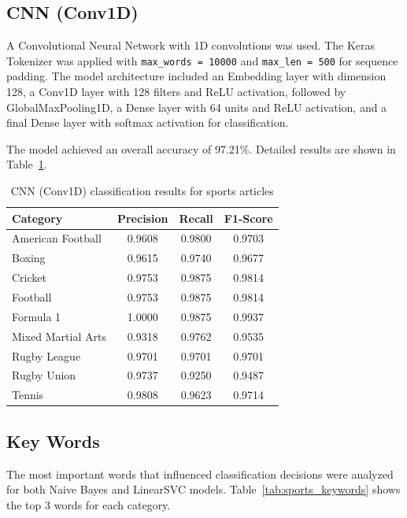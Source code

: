 \documentclass[12pt,a4paper]{article}
\begin{document}
\subsection{CNN (Conv1D)}

A Convolutional Neural Network with 1D convolutions was used. The Keras Tokenizer was applied with \texttt{max\_words = 10000} and \texttt{max\_len = 500} for sequence padding. The model architecture included an Embedding layer with dimension 128, a Conv1D layer with 128 filters and ReLU activation, followed by GlobalMaxPooling1D, a Dense layer with 64 units and ReLU activation, and a final Dense layer with softmax activation for classification.

The model achieved an overall accuracy of 97.21\%. Detailed results are shown in Table~\ref{tab:sports_cnn}.

\begin{table}[h]
\centering
\begin{tabular}{lccc}
\toprule
Category & Precision & Recall & F1-Score \\
\midrule
American Football & 0.9608 & 0.9800 & 0.9703 \\
Boxing & 0.9615 & 0.9740 & 0.9677 \\
Cricket & 0.9753 & 0.9875 & 0.9814 \\
Football & 0.9753 & 0.9875 & 0.9814 \\
Formula 1 & 1.0000 & 0.9875 & 0.9937 \\
Mixed Martial Arts & 0.9318 & 0.9762 & 0.9535 \\
Rugby League & 0.9701 & 0.9701 & 0.9701 \\
Rugby Union & 0.9737 & 0.9250 & 0.9487 \\
Tennis & 0.9808 & 0.9623 & 0.9714 \\
\bottomrule
\end{tabular}
\caption{CNN (Conv1D) classification results for sports articles}
\label{tab:sports_cnn}
\end{table}

\subsection{Key Words}

The most important words that influenced classification decisions were analyzed for both Naive Bayes and LinearSVC models. Table~\ref{tab:sports_keywords} shows the top 3 words for each category.
\end{document}

